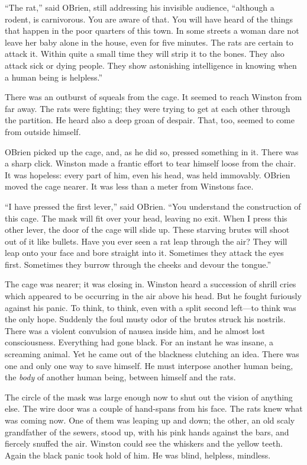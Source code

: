 ``The rat,'' said O\textquotesingle Brien, still addressing his invisible
audience, ``although a rodent, is carnivorous. You are aware of that. You
will have heard of the things that happen in the poor quarters of this
town. In some streets a woman dare not leave her baby alone in the
house, even for five minutes. The rats are certain to attack it. Within
quite a small time they will strip it to the bones. They also attack
sick or dying people. They show astonishing intelligence in knowing when
a human being is helpless.''

There was an outburst of squeals from the cage. It seemed to reach
Winston from far away. The rats were fighting; they were trying to get
at each other through the partition. He heard also a deep groan of
despair. That, too, seemed to come from outside himself.

O\textquotesingle Brien picked up the cage, and, as he did so, pressed
something in it. There was a sharp click. Winston made a frantic effort
to tear himself loose from the chair. It was hopeless: every part of
him, even his head, was held immovably. O\textquotesingle Brien moved
the cage nearer. It was less than a meter from Winston\textquotesingle s
face.

``I have pressed the first lever,'' said O\textquotesingle Brien. ``You
understand the construction of this cage. The mask will fit over your
head, leaving no exit. When I press this other lever, the door of the
cage will slide up. These starving brutes will shoot out of it like
bullets. Have you ever seen a rat leap through the air? They will leap
onto your face and bore straight into it. Sometimes they attack the eyes
first. Sometimes they burrow through the cheeks and devour the tongue.''

The cage was nearer; it was closing in. Winston heard a succession of
shrill cries which appeared to be occurring in the air above his head.
But he fought furiously against his panic. To think, to think, even with
a split second left---to think was the only hope. Suddenly the foul
musty odor of the brutes struck his nostrils. There was a violent
convulsion of nausea inside him, and he almost lost consciousness.
Everything had gone black. For an instant he was insane, a screaming
animal. Yet he came out of the blackness clutching an idea. There was
one and only one way to save himself. He must interpose another human
being, the \emph{body} of another human being, between himself and the
rats.

The circle of the mask was large enough now to shut out the vision of
anything else. The wire door was a couple of hand-spans from his face.
The rats knew what was coming now. One of them was leaping up and down;
the other, an old scaly grandfather of the sewers, stood up, with his
pink hands against the bars, and fiercely snuffed the air. Winston could
see the whiskers and the yellow teeth. Again the black panic took hold
of him. He was blind, helpless, mindless.

